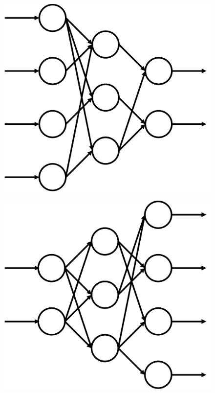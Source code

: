 \begin{figure}[!ht]
    \centering
    \begin{minipage}{.385\textwidth}
        \centering
        \includegraphics[width=0.75\linewidth]{res/pictures/game-theory-convergence.pdf}
        \label{fig:spieltheorie-konvergenz}
    \end{minipage}
    \hspace*{0.5cm}
    \begin{minipage}{.385\textwidth}
        \centering
        \includegraphics[width=0.75\linewidth]{res/pictures/game-theory-divergence.pdf}
        \label{fig:spieltheorie-divergenz}
    \end{minipage}
\end{figure}

